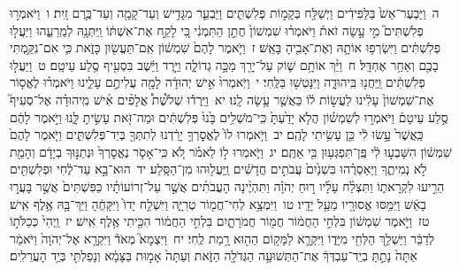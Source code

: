 \documentclass[18pt]{article}
\begin{document}
 {\loc ה~}וַיַּבְעֶר־אֵשׁ֙ בַּלַּפִּידִ֔ים וַיְשַׁלַּ֖ח בְּקָמ֣וֹת פְּלִשְׁתִּ֑ים וַיַּבְעֵ֛ר מִגָּדִ֥ישׁ וְעַד־קָמָ֖ה וְעַד־כֶּ֥רֶם זָֽיִת׃ \startlock
 {\loc ו~}וַיֹּאמְר֣וּ פְלִשְׁתִּים֮ מִ֣י עָ֣שָׂה זֹאת֒ וַיֹּאמְר֗וּ שִׁמְשׁוֹן֙ חֲתַ֣ן הַתִּמְנִ֔י כִּ֚י לָקַ֣ח אֶת־אִשְׁתּ֔וֹ וַֽיִּתְּנָ֖הּ לְמֵֽרֵעֵ֑הוּ וַיַּעֲל֣וּ פְלִשְׁתִּ֔ים וַיִּשְׂרְפ֥וּ אוֹתָ֛הּ וְאֶת־אָבִ֖יהָ בָּאֵֽשׁ׃ \startlock
 {\loc ז~}וַיֹּ֤אמֶר לָהֶם֙ שִׁמְשׁ֔וֹן אִֽם־תַּעֲשׂ֖וּן כָּזֹ֑את כִּ֛י אִם־נִקַּ֥מְתִּי בָכֶ֖ם וְאַחַ֥ר אֶחְדָּֽל׃ \startlock
 {\loc ח~}וַיַּ֨ךְ אוֹתָ֥ם שׁ֛וֹק עַל־יָרֵ֖ךְ מַכָּ֣ה גְדוֹלָ֑ה וַיֵּ֣רֶד וַיֵּ֔שֶׁב בִּסְעִ֖יף סֶ֥לַע עֵיטָֽם׃ \startlock
 {\loc ט~}וַיַּעֲל֣וּ פְלִשְׁתִּ֔ים וַֽיַּחֲנ֖וּ בִּֽיהוּדָ֑ה וַיִּנָּטְשׁ֖וּ בַּלֶּֽחִי׃ \startlock
 {\loc י~}וַיֹּֽאמְרוּ֙ אִ֣ישׁ יְהוּדָ֔ה לָמָ֖ה עֲלִיתֶ֣ם עָלֵ֑ינוּ וַיֹּאמְר֗וּ לֶאֱס֤וֹר אֶת־שִׁמְשׁוֹן֙ עָלִ֔ינוּ לַעֲשׂ֣וֹת ל֔וֹ כַּאֲשֶׁ֖ר עָ֥שָׂה לָֽנוּ׃ \startlock
 {\loc יא~}וַיֵּֽרְד֡וּ שְׁלֹ֩שֶׁת֩ אֲלָפִ֨ים אִ֜ישׁ מִֽיהוּדָ֗ה אֶל־סְעִיף֮ סֶ֣לַע עֵיטָם֒ וַיֹּאמְר֣וּ לְשִׁמְשׁ֗וֹן הֲלֹ֤א יָדַ֙עְתָּ֙ כִּֽי־מֹשְׁלִ֥ים בָּ֙נוּ֙ פְּלִשְׁתִּ֔ים וּמַה־זֹּ֖את עָשִׂ֣יתָ לָּ֑נוּ וַיֹּ֣אמֶר לָהֶ֔ם כַּֽאֲשֶׁר֙ עָ֣שׂוּ לִ֔י כֵּ֖ן עָשִׂ֥יתִי לָהֶֽם׃ \startlock
 {\loc יב~}וַיֹּ֤אמְרוּ לוֹ֙ לֶאֱסׇרְךָ֣ יָרַ֔דְנוּ לְתִתְּךָ֖ בְּיַד־פְּלִשְׁתִּ֑ים וַיֹּ֤אמֶר לָהֶם֙ שִׁמְשׁ֔וֹן הִשָּׁבְע֣וּ לִ֔י פֶּֽן־תִּפְגְּע֥וּן בִּ֖י אַתֶּֽם׃ \startlock
 {\loc יג~}וַיֹּ֧אמְרוּ ל֣וֹ לֵאמֹ֗ר לֹ֚א כִּֽי־אָסֹ֤ר נֶאֱסׇרְךָ֙ וּנְתַנּ֣וּךָ בְיָדָ֔ם וְהָמֵ֖ת לֹ֣א נְמִיתֶ֑ךָ וַיַּאַסְרֻ֗הוּ בִּשְׁנַ֙יִם֙ עֲבֹתִ֣ים חֲדָשִׁ֔ים וַֽיַּעֲל֖וּהוּ מִן־הַסָּֽלַע׃ \startlock
 {\loc יד~}הוּא־בָ֣א עַד־לֶ֔חִי וּפְלִשְׁתִּ֖ים הֵרִ֣יעוּ לִקְרָאת֑וֹ וַתִּצְלַ֨ח עָלָ֜יו ר֣וּחַ יְהֹוָ֗ה וַתִּהְיֶ֨ינָה הָעֲבֹתִ֜ים אֲשֶׁ֣ר עַל־זְרוֹעוֹתָ֗יו כַּפִּשְׁתִּים֙ אֲשֶׁ֣ר בָּעֲר֣וּ בָאֵ֔שׁ וַיִּמַּ֥סּוּ אֱסוּרָ֖יו מֵעַ֥ל יָדָֽיו׃ \startlock
 {\loc טו~}וַיִּמְצָ֥א לְחִי־חֲמ֖וֹר טְרִיָּ֑ה וַיִּשְׁלַ֤ח יָדוֹ֙ וַיִּקָּחֶ֔הָ וַיַּךְ־בָּ֖הּ אֶ֥לֶף אִֽישׁ׃ \startlock
 {\loc טז~}וַיֹּ֣אמֶר שִׁמְשׁ֔וֹן בִּלְחִ֣י הַחֲמ֔וֹר חֲמ֖וֹר חֲמֹרָתָ֑יִם בִּלְחִ֣י הַחֲמ֔וֹר הִכֵּ֖יתִי אֶ֥לֶף אִֽישׁ׃ \startlock
 {\loc יז~}וַֽיְהִי֙ כְּכַלֹּת֣וֹ לְדַבֵּ֔ר וַיַּשְׁלֵ֥ךְ הַלְּחִ֖י מִיָּד֑וֹ וַיִּקְרָ֛א לַמָּק֥וֹם הַה֖וּא רָ֥מַת לֶֽחִי׃ \startlock
 {\loc יח~}וַיִּצְמָא֮ מְאֹד֒ וַיִּקְרָ֤א אֶל־יְהֹוָה֙ וַיֹּאמַ֔ר אַתָּה֙ נָתַ֣תָּ בְיַֽד־עַבְדְּךָ֔ אֶת־הַתְּשׁוּעָ֥ה הַגְּדֹלָ֖ה הַזֹּ֑את וְעַתָּה֙ אָמ֣וּת בַּצָּמָ֔א וְנָפַלְתִּ֖י בְּיַ֥ד הָעֲרֵלִֽים׃ \startlock
\end{document}

